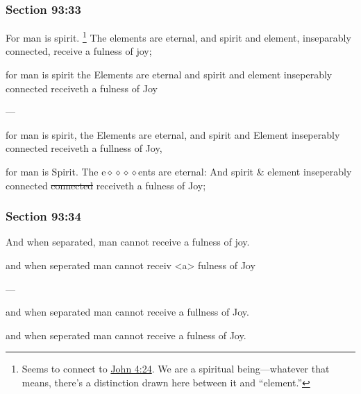 	\subsubsection{Section 93:33} %
		\label{DC93-33}

		For man is spirit.%
			\footnote{%
				Seems to connect to \hyperref[JOHN-4-24]{John 4:24}. We are a spiritual being---whatever that means, there's a distinction drawn here between it and ``element.''
				} 
		The elements are eternal, and spirit and element, inseparably connected, receive a fulness of joy;

		\begin{framed}
		\scriptsize
			\begin{compactdesc}
				\item[JSP] for man is spirit the Elements are eternal and spirit and element inseperably connected receiveth a fulness of Joy
				\item[BC] ---
				\item[RB2] for man is spirit, the Elements are eternal, and spirit and Element inseperably connected receiveth a fullness of Joy, 
				\item[RB1] for man is Spirit. The e$\diamond\diamond\diamond\diamond$ents are eternal: And spirit \& element inseperably connected \sout{connected} receiveth a fulness of Joy; 
			\end{compactdesc}
		\end{framed}

	\subsubsection{Section 93:34} %
		\label{DC93-34}

		And when separated, man cannot receive a fulness of joy.

		\begin{framed}
		\scriptsize
			\begin{compactdesc}
				\item[JSP] and when seperated man cannot receiv <a> fulness of Joy
				\item[BC] ---
				\item[RB2] and when separated man cannot receive a fullness of Joy.
				\item[RB1] and when seperated man cannot receive a fulness of Joy. 
			\end{compactdesc}
		\end{framed}

